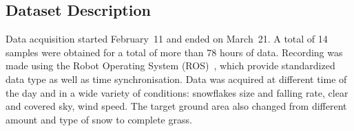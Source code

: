 \subsection{Dataset Description} %
Data acquisition started February~11 and ended on March~21. A total of 14 samples were obtained for a total of more than 78 hours of data. Recording was made using the Robot Operating System (ROS)~\cite{ROSWeb}, which provide standardized data type as well as time synchronisation. Data was acquired at different time of the day and in a wide variety of conditions: snowflakes size and falling rate, clear and covered sky, wind speed. The target ground area also changed from different amount and type of snow to complete grass.
